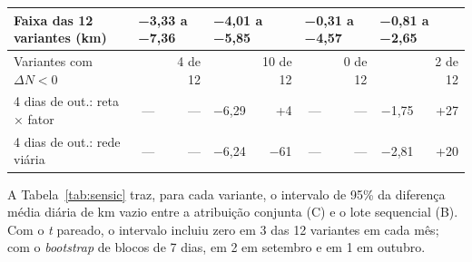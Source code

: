 \begin{table}[!htb]
\begin{tabular}{|l|r|r|r|r|r|r|r|r|}
\hline
Faixa das 12 variantes (km) & \multicolumn{2}{|l|}{−3,33 a −7,36} & \multicolumn{2}{|l|}{−4,01 a −5,85} & \multicolumn{2}{|l|}{−0,31 a −4,57} & \multicolumn{2}{|l|}{−0,81 a −2,65} \\
\hline
Variantes com $\Delta N<0$ & & 4 de 12 & & 10 de 12 & & 0 de 12 & & 2 de 12 \\
\hline
4 dias de out.: reta × fator & --- & --- & −6,29 & +4 & --- & --- & −1,75 & +27 \\
\hline
4 dias de out.: rede viária & --- & --- & −6,24 & −61 & --- & --- & −2,81 & +20 \\
\hline
\end{tabular}
\end{table}

A Tabela~\ref{tab:sensic} traz, para cada variante, o intervalo de 95\% da diferença média diária de km vazio entre a atribuição conjunta (C) e o lote sequencial (B). Com o \textit{t} pareado, o intervalo incluiu zero em 3 das 12 variantes em cada mês; com o \textit{bootstrap} de blocos de 7 dias, em 2 em setembro e em 1 em outubro.

